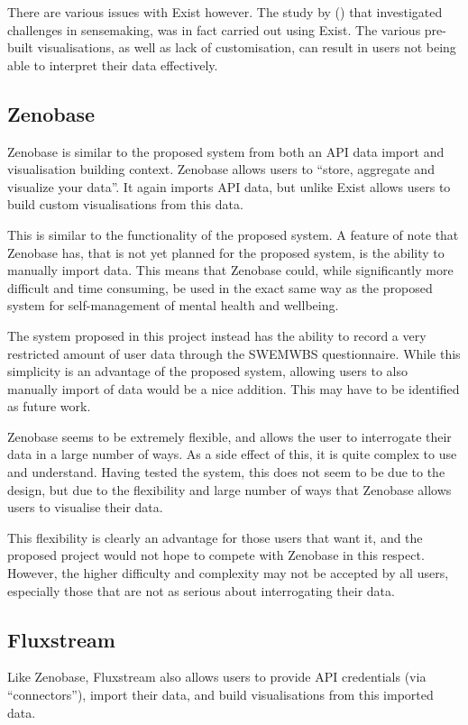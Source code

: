 \documentclass[11pt,openright,a4paper]{report}
\begin{document}
There are various issues with Exist however. The study by \citeauthor{jones2016sensemaking} (\citeyear{jones2016sensemaking}) that investigated challenges in sensemaking, was in fact carried out using Exist. The various pre-built visualisations, as well as lack of customisation, can result in users not being able to interpret their data effectively.

\subsection{Zenobase}
Zenobase \parencite{zenobase} is similar to the proposed system from both an API data import and visualisation building context. Zenobase allows users to \enquote{store, aggregate and visualize your data}. It again imports API data, but unlike Exist allows users to build custom visualisations from this data.

This is similar to the functionality of the proposed system. A feature of note that Zenobase has, that is not yet planned for the proposed system, is the ability to manually import data. This means that Zenobase could, while significantly more difficult and time consuming, be used in the exact same way as the proposed system for self-management of mental health and wellbeing.

The system proposed in this project instead has the ability to record a very restricted amount of user data through the SWEMWBS questionnaire. While this simplicity is an advantage of the proposed system, allowing users to also manually import of data would be a nice addition. This may have to be identified as future work.

Zenobase seems to be extremely flexible, and allows the user to interrogate their data in a large number of ways. As a side effect of this, it is quite complex to use and understand. Having tested the system, this does not seem to be due to the design, but due to the flexibility and large number of ways that Zenobase allows users to visualise their data.

This flexibility is clearly an advantage for those users that want it, and the proposed project would not hope to compete with Zenobase in this respect. However, the higher difficulty and complexity may not be accepted by all users, especially those that are not as serious about interrogating their data.

\subsection{Fluxstream}
Like Zenobase, Fluxstream \parencite{fluxstream} also allows users to provide API credentials (via \enquote{connectors}), import their data, and build visualisations from this imported data.
\end{document}
